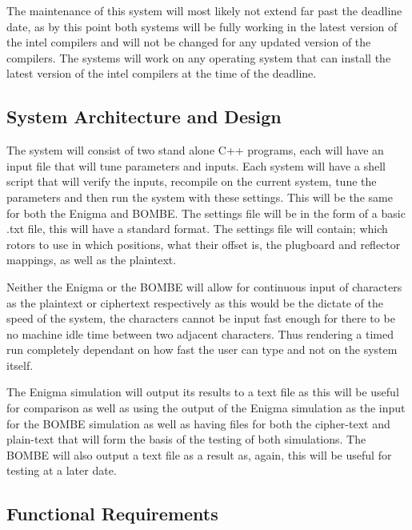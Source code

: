\documentclass[12pt,a4paper]{article}
\begin{document}
The maintenance of this system will most likely not extend far past the deadline date, as by this point both systems will be fully working in the latest version of the intel compilers and will not be changed for any updated version of the compilers. The systems will work on any operating system that can install the latest version of the intel compilers at the time of the deadline.

\subsection{System Architecture and Design}

The system will consist of two stand alone C++ programs, each will have an input file that will tune parameters and inputs. Each system will have a shell script that will verify the inputs, recompile on the current system, tune the parameters and then run the system with these settings. This will be the same for both the Enigma and BOMBE. The settings file will be in the form of a basic .txt file, this will have a standard format. The settings file will contain; which rotors to use in which positions, what their offset is, the plugboard and reflector mappings, as well as the plaintext. 

Neither the Enigma or the BOMBE will allow for continuous input of characters as the plaintext or ciphertext respectively as this would be the dictate of the speed of the system, the characters cannot be input fast enough for there to be no machine idle time between two adjacent characters. Thus rendering a timed run completely dependant on how fast the user can type and not on the system itself.

The Enigma simulation will output its results to a text file as this will be useful for comparison as well as using the output of the Enigma simulation as the input for the BOMBE simulation as well as having files for both the cipher-text and plain-text that will form the basis of the testing of both simulations. The BOMBE will also output a text file as a result as, again, this will be useful for testing at a later date. 

\subsection{Functional Requirements}
\end{document}
